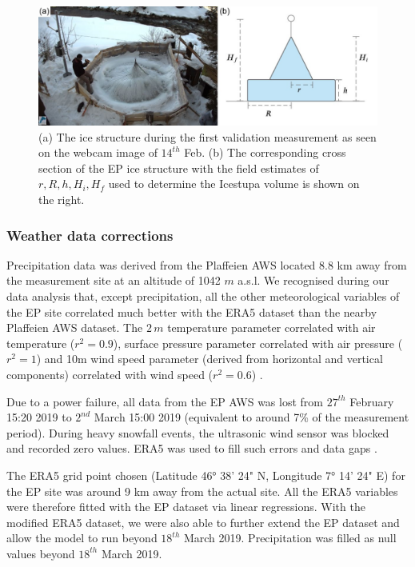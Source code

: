 \documentclass[utf8]{frontiersSCNS} %
\begin{document}
\begin{figure} \centering \includegraphics[width=15cm]{./Figures/Figure_2.jpg}
\caption{(a) The ice structure during the first validation measurement as seen on the webcam image of
  $14^{th}$ Feb. (b) The corresponding cross section of the EP ice structure with the field estimates of $r, R,
  h, H_i, H_f$ used to determine the Icestupa volume is shown on the right.} \label{fig:site} \end{figure}

\subsubsection{Weather data corrections}
Precipitation data was derived from the Plaffeien AWS \citep{meteoswiss} located 8.8 km away from the measurement site
at an altitude of 1042 $m$ a.s.l.  We recognised during our data analysis that, except precipitation, all the other
meteorological variables of the EP site correlated much better with the ERA5 dataset than the nearby Plaffeien AWS
dataset. The $2\,m$ temperature parameter correlated with air temperature ($r^2 =0.9 $), surface pressure parameter
correlated with air pressure ($r^2 = 1$) and 10m wind speed parameter (derived from horizontal and vertical components)
correlated with wind speed ($r^2 =0.6 $) .

Due to a power failure, all data from the EP AWS was lost from $27^{th}$ February 15:20 2019 to $2^{nd}$ March 15:00
2019 (equivalent to around 7\% of the measurement period). During heavy snowfall events, the ultrasonic wind sensor was
blocked and recorded zero values. ERA5 was used to fill such errors and data gaps .

The ERA5 grid point chosen (Latitude 46° 38' 24" N, Longitude 7° 14' 24" E) for the EP site was around 9 km
away from the actual site.  All the ERA5 variables were therefore fitted with the EP dataset via linear regressions.
With the modified ERA5 dataset, we were also able to further extend the EP dataset and allow the model to
run beyond $18^{th}$ March 2019. Precipitation was filled as null values beyond $18^{th}$ March 2019.
\end{document}
